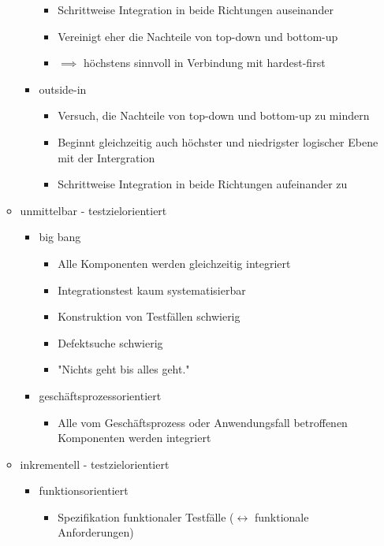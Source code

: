 \documentclass{article}
\begin{document}
\begin{itemize}
\begin{itemize}
\begin{itemize}
\begin{itemize}
        \item Schrittweise Integration in beide Richtungen auseinander
        \item Vereinigt eher die Nachteile von top-down und bottom-up
        \item $\implies$ höchstens sinnvoll in Verbindung mit hardest-first
      \end{itemize}
      \item outside-in
      \begin{itemize}
        \item Versuch, die Nachteile von top-down und bottom-up zu mindern
        \item Beginnt gleichzeitig auch höchster und niedrigster logischer Ebene mit der Intergration
        \item Schrittweise Integration in beide Richtungen aufeinander zu
      \end{itemize}
    \end{itemize}
    \item unmittelbar - testzielorientiert
    \begin{itemize}
      \item big bang
      \begin{itemize}
        \item Alle Komponenten werden gleichzeitig integriert
        \item Integrationstest kaum systematisierbar
        \item Konstruktion von Testfällen schwierig
        \item Defektsuche schwierig
        \item "Nichts geht bis alles geht."
      \end{itemize}
      \item geschäftsprozessorientiert
      \begin{itemize}
        \item Alle vom Geschäftsprozess oder Anwendungsfall betroffenen Komponenten werden integriert
      \end{itemize}
    \end{itemize}
    \item inkrementell - testzielorientiert
    \begin{itemize}
      \item funktionsorientiert
      \begin{itemize}
        \item Spezifikation funktionaler Testfälle ($\leftrightarrow$ funktionale Anforderungen)

\end{itemize}
\end{itemize}
\end{itemize}
\end{itemize}
\end{document}
